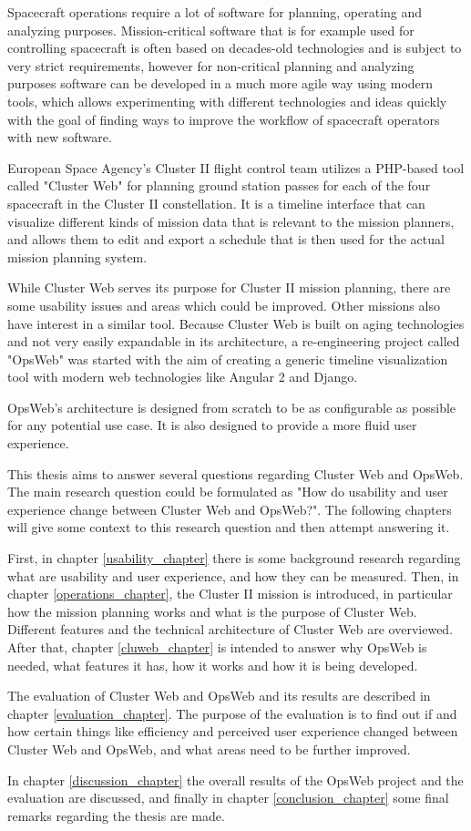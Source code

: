 Spacecraft operations require a lot of software for planning, operating and analyzing purposes. Mission-critical software that is for example used for controlling spacecraft is often based on decades-old technologies and is subject to very strict requirements, however for non-critical planning and analyzing purposes software can be developed in a much more agile way using modern tools, which allows experimenting with different technologies and ideas quickly with the goal of finding ways to improve the workflow of spacecraft operators with new software.

European Space Agency's Cluster II flight control team utilizes a PHP-based tool called "Cluster Web" for planning ground station passes for each of the four spacecraft in the Cluster II constellation. It is a timeline interface that can visualize different kinds of mission data that is relevant to the mission planners, and allows them to edit and export a schedule that is then used for the actual mission planning system.

While Cluster Web serves its purpose for Cluster II mission planning, there are some usability issues and areas which could be improved. Other missions also have interest in a similar tool. Because Cluster Web is built on aging technologies and not very easily expandable in its architecture, a re-engineering project called "OpsWeb" was started with the aim of creating a generic timeline visualization tool with modern web technologies like Angular 2 and Django.

OpsWeb's architecture is designed from scratch to be as configurable as possible for any potential use case. It is also designed to provide a more fluid user experience.

This thesis aims to answer several questions regarding Cluster Web and OpsWeb. The main research question could be formulated as "How do usability and user experience change between Cluster Web and OpsWeb?". The following chapters will give some context to this research question and then attempt answering it.

First, in chapter \ref{usability_chapter} there is some background research regarding what are usability and user experience, and how they can be measured. Then, in chapter \ref{operations_chapter}, the Cluster II mission is introduced, in particular how the mission planning works and what is the purpose of Cluster Web. Different features and the technical architecture of Cluster Web are overviewed. After that, chapter \ref{cluweb_chapter} is intended to answer why OpsWeb is needed, what features it has, how it works and how it is being developed.

The evaluation of Cluster Web and OpsWeb and its results are described in chapter \ref{evaluation_chapter}. The purpose of the evaluation is to find out if and how certain things like efficiency and perceived user experience changed between Cluster Web and OpsWeb, and what areas need to be further improved. 

In chapter \ref{discussion_chapter} the overall results of the OpsWeb project and the evaluation are discussed, and finally in chapter \ref{conclusion_chapter} some final remarks regarding the thesis are made.